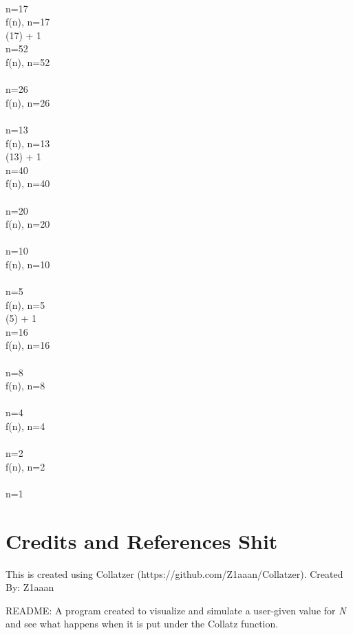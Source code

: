 \documentclass{article}
\begin{document}
 \Rightarrow {} 
 \\ 
 \Rightarrow n=17
 \\[3mm] 
f(n), n=17
 \\ 
 (17) + 1
 \\ 
 \Rightarrow n=52
 \\[3mm] 
f(n), n=52
 \\ 
 \Rightarrow {} 
 \\ 
 \Rightarrow n=26
 \\[3mm] 
f(n), n=26
 \\ 
 \Rightarrow {} 
 \\ 
 \Rightarrow n=13
 \\[3mm] 
f(n), n=13
 \\ 
 (13) + 1
 \\ 
 \Rightarrow n=40
 \\[3mm] 
f(n), n=40
 \\ 
 \Rightarrow {} 
 \\ 
 \Rightarrow n=20
 \\[3mm] 
f(n), n=20
 \\ 
 \Rightarrow {} 
 \\ 
 \Rightarrow n=10
 \\[3mm] 
f(n), n=10
 \\ 
 \Rightarrow {} 
 \\ 
 \Rightarrow n=5
 \\[3mm] 
f(n), n=5
 \\ 
 (5) + 1
 \\ 
 \Rightarrow n=16
 \\[3mm] 
f(n), n=16
 \\ 
 \Rightarrow {} 
 \\ 
 \Rightarrow n=8
 \\[3mm] 
f(n), n=8
 \\ 
 \Rightarrow {} 
 \\ 
 \Rightarrow n=4
 \\[3mm] 
f(n), n=4
 \\ 
 \Rightarrow {} 
 \\ 
 \Rightarrow n=2
 \\[3mm] 
f(n), n=2
 \\ 
 \Rightarrow {} 
 \\ 
 \Rightarrow n=1
 \\[3mm] 

    \section{Credits and References Shit}
    This is created using Collatzer (https://github.com/Z1aaan/Collatzer).
    Created By: Z1aaan
    
    README:
    A program created to visualize and simulate a user-given value for \textit{N} 
    and see what happens when it is put under the Collatz function.
    
\end{document}
